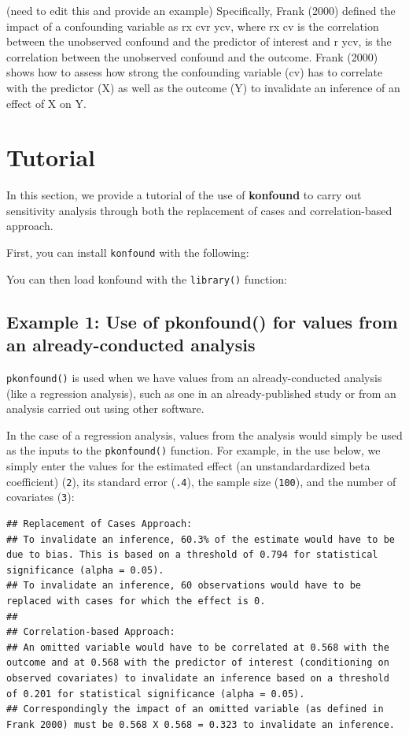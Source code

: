 \documentclass[man]{apa6}
\theoremstyle{definition}
\theoremstyle{definition}
\theoremstyle{definition}
\theoremstyle{remark}
\begin{document}
(need to edit this and provide an example) Specifically, Frank (2000)
defined the impact of a confounding variable as rx cvr ycv, where rx cv
is the correlation between the unobserved confound and the predictor of
interest and r ycv, is the correlation between the unobserved confound
and the outcome. Frank (2000) shows how to assess how strong the
confounding variable (cv) has to correlate with the predictor (X) as
well as the outcome (Y) to invalidate an inference of an effect of X on
Y.

\section{Tutorial}\label{tutorial}

In this section, we provide a tutorial of the use of \textbf{konfound}
to carry out sensitivity analysis through both the replacement of cases
and correlation-based approach.

First, you can install \texttt{konfound} with the following:

You can then load konfound with the \texttt{library()} function:

\subsection{Example 1: Use of pkonfound() for values from an
already-conducted
analysis}\label{example-1-use-of-pkonfound-for-values-from-an-already-conducted-analysis}

\texttt{pkonfound()} is used when we have values from an
already-conducted analysis (like a regression analysis), such as one in
an already-published study or from an analysis carried out using other
software.

In the case of a regression analysis, values from the analysis would
simply be used as the inputs to the \texttt{pkonfound()} function. For
example, in the use below, we simply enter the values for the estimated
effect (an unstandardardized beta coefficient) (\texttt{2}), its
standard error (\texttt{.4}), the sample size (\texttt{100}), and the
number of covariates (\texttt{3}):

\begin{verbatim}
## Replacement of Cases Approach:
## To invalidate an inference, 60.3% of the estimate would have to be due to bias. This is based on a threshold of 0.794 for statistical significance (alpha = 0.05).
## To invalidate an inference, 60 observations would have to be replaced with cases for which the effect is 0.
## 
## Correlation-based Approach:
## An omitted variable would have to be correlated at 0.568 with the outcome and at 0.568 with the predictor of interest (conditioning on observed covariates) to invalidate an inference based on a threshold of 0.201 for statistical significance (alpha = 0.05).
## Correspondingly the impact of an omitted variable (as defined in Frank 2000) must be 0.568 X 0.568 = 0.323 to invalidate an inference.
\end{verbatim}
\end{document}
